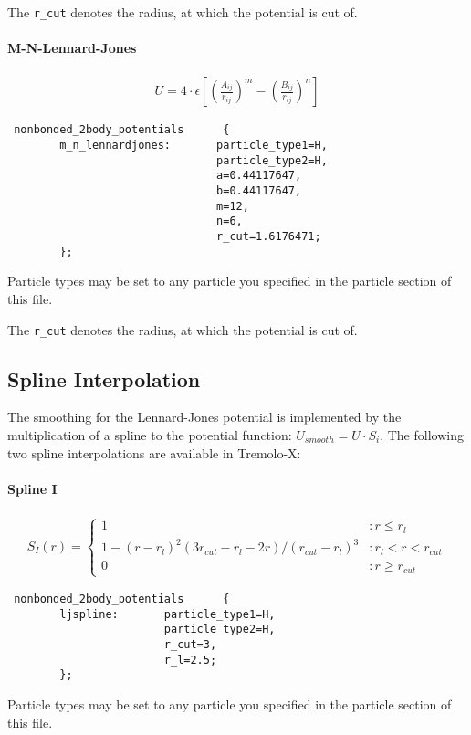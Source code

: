 The {\tt r\_cut} denotes the radius, at which the potential is cut of.


\paragraph{M-N-Lennard-Jones}
\begin{align*}
U = 4 \cdot \epsilon \left[ \left( \frac{A_{ij}}{r_{ij}}\right)^m-\left(\frac{B_{ij}}{r_{ij}} \right)^n \right]
\end{align*}

\begin{lstlisting}
 nonbonded_2body_potentials      {
        m_n_lennardjones:       particle_type1=H,
                                particle_type2=H,
                                a=0.44117647,
                                b=0.44117647,
                                m=12,
                                n=6,
                                r_cut=1.6176471;
        };
\end{lstlisting}
Particle types may be set to any particle you specified in the particle section of this file.

The {\tt r\_cut} denotes the radius, at which the potential is cut of.


\subsection{Spline Interpolation}
The smoothing for the Lennard-Jones potential is implemented by the multiplication of a spline to the potential function: $U_{smooth}=U \cdot S_i$.
The following two spline interpolations are available in Tremolo-X:

\paragraph{Spline I} 
\begin{align*}
S_{I}(r) = \left\{ \begin{array}{ll} 1 &:r \leq r_l \\1-\left( r -r_l\right)^2\left(3r_{cut}-r_l- 2r\right)/\left(r_{cut}-r_l\right)^3&:r_l < r < r_{cut} \\0&:r\geq r_{cut} \end{array} \right.
\end{align*}

\begin{lstlisting}
 nonbonded_2body_potentials      {
        ljspline:       particle_type1=H,
                        particle_type2=H,
                        r_cut=3,
                        r_l=2.5;
        };
\end{lstlisting}
Particle types may be set to any particle you specified in the particle section of this file.

